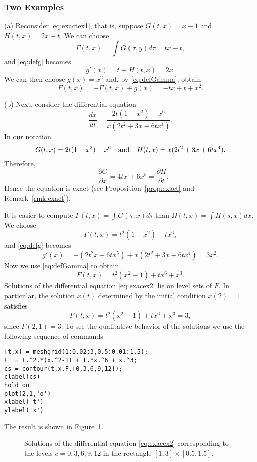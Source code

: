 \documentclass{ximera}
\begin{document}
\subsubsection*{Two Examples}

\noindent (a) Reconsider \eqref{eq:exactex1}, that is, suppose $G(t,x)=x-1$ and 
$H(t,x)=2x-t$.  We can choose
\[
\Gamma(t,x)=\int G(\tau,y)d\tau = tx-t,
\]
and \eqref{eq:defg} becomes
\[
g'(x) = t + H(t,x) = 2x.
\]
We can then choose $g(x)=x^2$ and, by \eqref{eq:defGamma}, obtain
\[
F(t,x) = -\Gamma(t,x) + g(x) = -tx + t + x^2.
\]

\noindent (b) Next, consider the differential equation
\begin{equation}  \label{eq:exacex2}
\frac{dx}{dt} = \frac{2t(1-x^2)-x^6}{x(2t^2+3x+6tx^4)}.
\end{equation}
In our notation
\[
G(t,x) = 2t(1-x^2)-x^6 \quad\mbox{and}\quad H(t,x) = x(2t^2+3x+6tx^4).
\]
Therefore, 
\[
-\frac{\partial G}{\partial x} = 4tx + 6x^5 = 
\frac{\partial H}{\partial t}.
\]
Hence the equation is exact (see Proposition~\ref{prop:exact} and 
Remark~\ref{rmk:exact}).  

It is easier to compute $\Gamma(t,x)=\int G(\tau,x) d\tau$ than 
$\Omega(t,x)=\int H(s,x)dx$.  We choose 
\[
\Gamma(t,x) = t^2(1-x^2) - tx^6,
\]
and \eqref{eq:defg} becomes
\[
g'(x) = -(2t^2 x + 6tx^5) + x(2t^2+3x+6tx^4) = 3x^2.
\]
Now we use \eqref{eq:defGamma} to obtain
\[
F(t,x) = t^2(x^2-1) + tx^6 + x^3.
\]
Solutions of the differential equation \eqref{eq:exacex2} lie on
level sets of $F$.  In particular, the solution $x(t)$
determined by the initial condition $x(2)=1$ satisfies 
\[
F(t,x)=t^2(x^2-1) + tx^6 + x^3 = 3,
\]
since $F(2,1)=3$.  To see the qualitative behavior of the
solutions we use the following sequence 
of \Matlab commands
\begin{verbatim}
[t,x] = meshgrid(1:0.02:3,0.5:0.01:1.5);
F  = t.^2.*(x.^2-1) + t.*x.^6 + x.^3;
cs = contour(t,x,F,[0,3,6,9,12]);
clabel(cs)
hold on
plot(2,1,'o')                  
xlabel('t')
ylabel('x')
\end{verbatim}
The result is shown in Figure~\ref{Fig:contour3}.  

\begin{figure}[htb]
  \centerline{%
  }
  \caption{Solutions of the differential equation
\protect\eqref{eq:exacex2}
  corresponding to the levels $c=0,3,6,9,12$ in the rectangle
  $[1,3]\times [0.5,1.5]$.}
\label{Fig:contour3}
\end{figure}


\EXER

\end{document}
